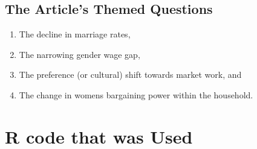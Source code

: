 \documentclass[12pt]{article}
\begin{document}
\subsection{The Article’s Themed Questions}


\begin{enumerate}
\item The decline in marriage rates,
\item The narrowing gender wage gap,
\item  The preference (or cultural) shift towards market work, and
\item  The change in womens bargaining power within the household.
\end{enumerate}
\section{ R code that was Used}
\end{document}
